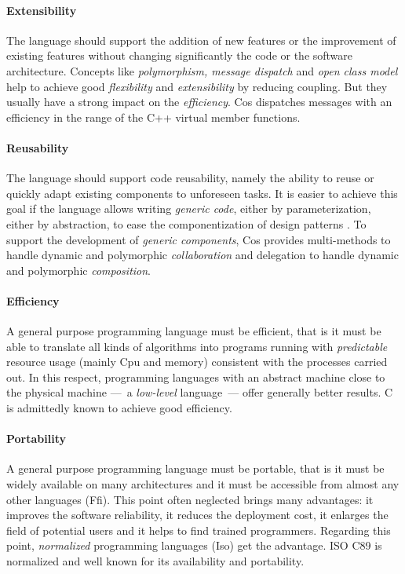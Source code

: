 \documentclass[preprint,10pt]{sigplanconf}
\newcommand{\acronym}[1]{{\sc #1}\xspace}
\newcommand{\Cpu}    {\acronym{Cpu}}
\newcommand{\Ffi}    {\acronym{Ffi}}
\newcommand{\Iso}    {\acronym{Iso}}
\newcommand{\ProgLang}[1]{{\sc #1}\xspace}
\newcommand{\Cpp}       {\ProgLang{C{\small ++}}}
\newcommand{\Cos}       {\ProgLang{Cos}}
\begin{document}
\paragraph{Extensibility}

The language should support the addition of new features or the improvement of existing features without changing significantly the code or the software architecture. Concepts like {\em polymorphism, message dispatch} and {\em open class model} help to achieve good {\em flexibility} and {\em extensibility} by reducing coupling. But they usually have a strong impact on the {\em efficiency}. \Cos dispatches messages with an efficiency in the range of the \Cpp virtual member functions. 

\paragraph{Reusability}

The language should support code reusability, namely the ability to reuse or quickly adapt existing components to unforeseen tasks. It is easier to achieve this goal if the language allows writing {\em generic code}, either by parameterization, either by abstraction, to ease the componentization of design patterns \cite{rege99,meyer06-1,meyer06-2}. To support the development of {\em generic components}, \Cos provides multi-methods to handle dynamic and polymorphic {\em collaboration} and delegation to handle dynamic and polymorphic {\em composition}.

\paragraph{Efficiency}

A general purpose programming language must be efficient, that is it must be able to translate all kinds of algorithms into programs running with {\em predictable} resource usage (mainly \Cpu and memory) consistent with the processes carried out. In this respect, programming languages with an abstract machine close to the physical machine ---~a {\em low-level} language~--- offer generally better results. C is admittedly known to achieve good efficiency.

\paragraph{Portability}

A general purpose programming language must be portable, that is it must be widely available on many architectures and it must be accessible from almost any other languages (\Ffi). This point often neglected brings many advantages: it improves the software reliability, it reduces the deployment cost, it enlarges the field of potential users and it helps to find trained programmers. Regarding this point, {\em normalized} programming languages (\Iso) get the advantage. ISO C89 is normalized and well known for its availability and portability.
\end{document}
